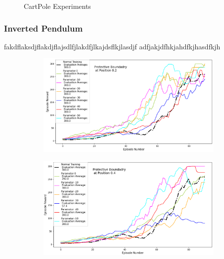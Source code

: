 \documentclass[journal]{IEEEtran}
\begin{document}
\begin{figure}[H]
\begin{subfigure}[b]{0.5\textwidth}
    \end{subfigure}
    \caption{CartPole Experiments}
    \label{fig:CartPole}
\end{figure}


\subsubsection{Inverted Pendulum}
fakdflaksdjflakdjflajsdlfjlakdfjlkajdsflkjlasdjf
adfjakjdfhkjahdfkjhasdfkjh
\begin{figure}[H]
    \centering
    \begin{subfigure}[b]{0.5\textwidth}
      \centering
      \includegraphics[width=\textwidth]{Inverted_Pendulum_with_Boundary_at_0.2.png}
    \end{subfigure}
    \vspace*{0.0mm}
    \begin{subfigure}[b]{0.5\textwidth}
      \centering
      \includegraphics[width=\textwidth]{Inverted_Pendulum_with_Boundary_at_0.4.png}
    \end{subfigure}
    \vspace*{0.0mm}
    \begin{subfigure}[b]{0.5\textwidth}

\end{subfigure}
\end{figure}
\end{document}
